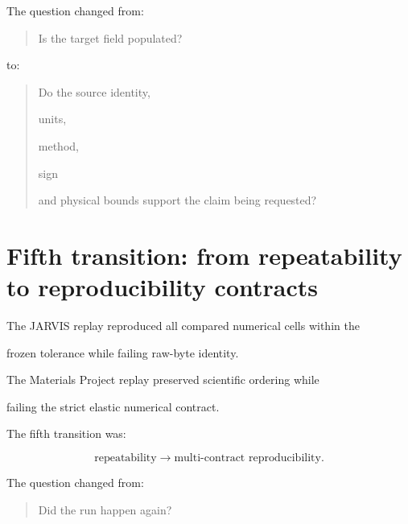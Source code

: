 \documentclass[11pt,a4paper,oneside]{report}
\begin{document}
The question changed from:



\begin{quote}



Is the target field populated?



\end{quote}



to:



\begin{quote}



Do the source identity,

units,

method,

sign

and physical bounds support the claim being requested?



\end{quote}





\section{Fifth transition: from repeatability to reproducibility contracts}



The JARVIS replay reproduced all compared numerical cells within the

frozen tolerance while failing raw-byte identity.



The Materials Project replay preserved scientific ordering while

failing the strict elastic numerical contract.



The fifth transition was:



\begin{equation}
\text{repeatability}
\rightarrow
\text{multi-contract reproducibility}.
\end{equation}



The question changed from:



\begin{quote}



Did the run happen again?



\end{quote}
\end{document}
